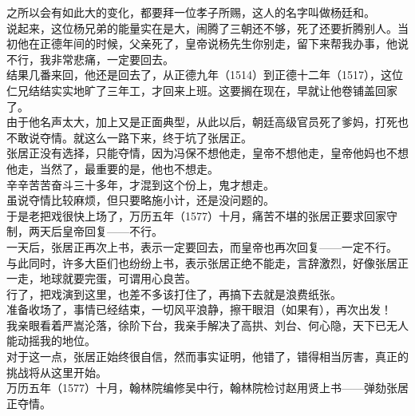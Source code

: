 \begin{multicols}{\theparacolNo}
之所以会有如此大的变化，都要拜一位孝子所赐，这人的名字叫做杨廷和。\\

说起来，这位杨兄弟的能量实在是大，闹腾了三朝还不够，死了还要折腾别人。当初他在正德年间的时候，父亲死了，皇帝说杨先生你别走，留下来帮我办事，他说不行，我非常悲痛，一定要回去。\\

结果几番来回，他还是回去了，从正德九年（1514）到正德十二年（1517），这位仁兄结结实实地旷了三年工，才回来上班。这要搁在现在，早就让他卷铺盖回家了。\\

由于他名声太大，加上又是正面典型，从此以后，朝廷高级官员死了爹妈，打死也不敢说夺情。就这么一路下来，终于坑了张居正。\\

张居正没有选择，只能夺情，因为冯保不想他走，皇帝不想他走，皇帝他妈也不想他走，当然了，最重要的是，他也不想走。\\

辛辛苦苦奋斗三十多年，才混到这个份上，鬼才想走。\\

虽说夺情比较麻烦，但只要略施小计，还是没问题的。\\

于是老把戏很快上场了，万历五年（1577）十月，痛苦不堪的张居正要求回家守制，两天后皇帝回复——不行。\\

一天后，张居正再次上书，表示一定要回去，而皇帝也再次回复——一定不行。\\

与此同时，许多大臣们也纷纷上书，表示张居正绝不能走，言辞激烈，好像张居正一走，地球就要完蛋，可谓用心良苦。\\

行了，把戏演到这里，也差不多该打住了，再搞下去就是浪费纸张。\\

准备收场了，事情已经结束，一切风平浪静，擦干眼泪（如果有），再次出发！\\

我亲眼看着严嵩沦落，徐阶下台，我亲手解决了高拱、刘台、何心隐，天下已无人能动摇我的地位。\\

对于这一点，张居正始终很自信，然而事实证明，他错了，错得相当厉害，真正的挑战将从这里开始。\\

万历五年（1577）十月，翰林院编修吴中行，翰林院检讨赵用贤上书——弹劾张居正夺情。\\


\end{multicols}
